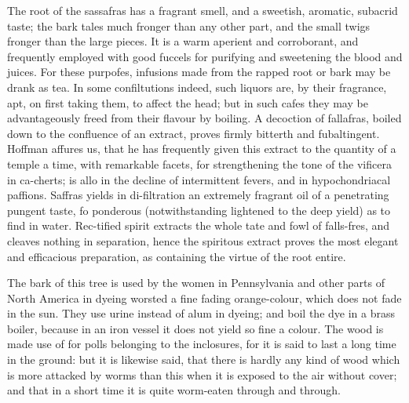 \documentclass{article}
\begin{document}
The root of the sassafras has a fragrant smell, and a sweetish, aromatic, subacrid taste; the bark tales much fronger than any other part, and the small twigs fronger than the large pieces. It is a warm aperient and corroborant, and frequently employed with good fuccels for purifying and sweetening the blood and juices. For these purpofes, infusions made from the rapped root or bark may be drank as tea. In some confiltutions indeed, such liquors are, by their fragrance, apt, on first taking them, to affect the head; but in such cafes they may be advantageously freed from their flavour by boiling. A decoction of fallafras, boiled down to the confluence of an extract, proves firmly bitterth and fubaltingent. Hoffman affures us, that he has frequently given this extract to the quantity of a temple a time, with remarkable facets, for strengthening the tone of the vificera in ca-cherts; is allo in the decline of intermittent fevers, and in hypochondriacal paffions. Saffras yields in di-filtration an extremely fragrant oil of a penetrating pungent taste, fo ponderous (notwithstanding lightened to the deep yield) as to find in water. Rec-tified spirit extracts the whole tate and fowl of falls-fres, and cleaves nothing in separation, hence the spiritous extract proves the most elegant and efficacious preparation, as containing the virtue of the root entire.

The bark of this tree is used by the women in Pennsylvania and other parts of North America in dyeing worsted a fine fading orange-colour, which does not fade in the sun. They use urine instead of alum in dyeing; and boil the dye in a brass boiler, because in an iron vessel it does not yield so fine a colour. The wood is made use of for polls belonging to the inclosures, for it is said to last a long time in the ground: but it is likewise said, that there is hardly any kind of wood which is more attacked by worms than this when it is exposed to the air without cover; and that in a short time it is quite worm-eaten through and through.
\end{document}
